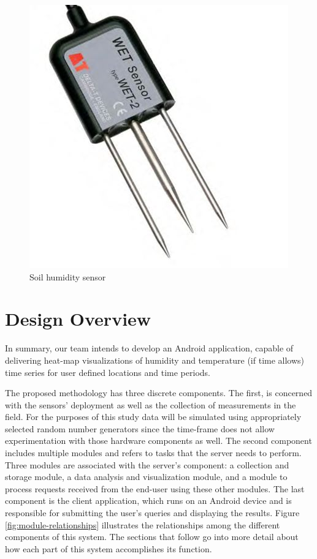 \documentclass{article}
\begin{document}
\begin{figure}
\begin{center}
   \includegraphics[width=1\linewidth,trim={0 0 0 0cm},clip]{Images/HumSens.jpg}
\end{center}
\vspace{-0.2in}
   \caption{Soil humidity sensor}
   \label{fig:Humsens}
\end{figure}


\section{Design Overview}

In summary, our team intends to develop an Android application, capable of delivering heat-map visualizations of humidity and temperature (if time allows) time series for user defined locations and time periods. 

The proposed methodology has three discrete components. The first, is concerned with the sensors’ deployment as well as the collection of measurements in the field. For the purposes of this study data will be simulated using appropriately selected random number generators since the time-frame does not allow experimentation with those hardware components as well. The second component includes multiple modules and refers to tasks that the server needs to perform. Three modules are associated with the server’s component: a collection and storage module, a data analysis and visualization module, and a module to process requests received from the end-user using these other modules. The last component is the client application, which runs on an Android device and is responsible for submitting the user’s queries and displaying the results. 
Figure \ref{fig:module-relationships} illustrates the relationships among the different components of this system.
The sections that follow go into more detail about how each part of this system accomplishes its function. 
\end{document}
